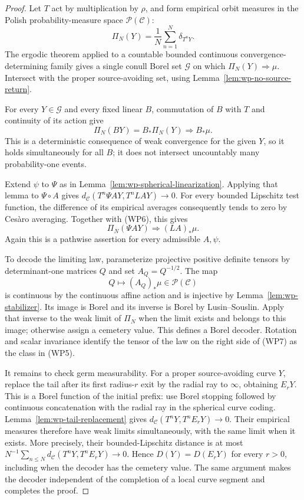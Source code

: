 \documentclass[11pt]{article}
\theoremstyle{definition}\newtheorem{definition}[theorem]{Definition}
\theoremstyle{remark}\newtheorem{remark}[theorem]{Remark}
\begin{document}
\begin{proof}
Let $T$ act by multiplication by $\rho$, and form empirical orbit
measures in the Polish probability-measure space $\mathcal P(\mathcal C)$:
\[
 \Pi_N(Y)=\frac1N\sum_{n=1}^N\delta_{T^nY}.
\]
The ergodic theorem applied to a countable bounded continuous
convergence-determining family gives a single conull Borel set
$\mathcal G$ on which $\Pi_N(Y)\Rightarrow\mu$.  Intersect with
the proper source-avoiding set, using
Lemma~\ref{lem:wp-no-source-return}.

For every $Y\in\mathcal G$ and every fixed linear $B$, commutation
of $B$ with $T$ and continuity of its action give
\[
 \Pi_N(BY)=B_*\Pi_N(Y)\Rightarrow B_*\mu.
 \tag{WP6}
\]
This is a deterministic consequence of weak convergence for the
given $Y$, so it holds simultaneously for all $B$; it does not
intersect uncountably many probability-one events.

Extend $\psi$ to $\Psi$ as in
Lemma~\ref{lem:wp-spherical-linearization}.  Applying that lemma
to $\Psi\circ A$ gives
$d_{\mathcal C}(T^n\Psi AY,T^nLAY)\to0$.
For every bounded Lipschitz test function, the difference of its
empirical averages consequently tends to zero by Ces\`aro averaging.
Together with (WP6), this gives
\[
 \Pi_N(\Psi AY)\Rightarrow(LA)_*\mu.
 \tag{WP7}
\]
Again this is a pathwise assertion for every admissible $A,\psi$.

To decode the limiting law, parameterize projective positive
definite tensors by determinant-one matrices $Q$ and set
$A_Q=Q^{-1/2}$.  The map
\[
 Q\longmapsto(A_Q)_*\mu\in\mathcal P(\mathcal C)
\]
is continuous by the continuous affine action and is injective by
Lemma~\ref{lem:wp-stabilizer}.  Its image is Borel and its inverse
is Borel by Lusin--Souslin.  Apply that inverse to the weak limit
of $\Pi_N$ when the limit exists and belongs to this image; otherwise
assign a cemetery value.  This defines a Borel decoder.
Rotation and scalar invariance identify the tensor of the law on
the right side of (WP7) as the class in (WP5).

It remains to check germ measurability.  For a proper source-avoiding
curve $Y$, replace the tail after its first radius-$r$ exit by the
radial ray to $\infty$, obtaining $E_rY$.  This is a Borel function
of the initial prefix: use Borel stopping followed by continuous
concatenation with the radial ray in the spherical curve coding.
Lemma~\ref{lem:wp-tail-replacement} gives
$d_{\mathcal C}(T^nY,T^nE_rY)\to0$.  Their empirical measures
therefore have weak limits simultaneously, with the same limit
when it exists.  More precisely, their bounded-Lipschitz distance is at most
$N^{-1}\sum_{n\le N}d_{\mathcal C}(T^nY,T^nE_rY)\to0$.
Hence $D(Y)=D(E_rY)$ for every $r>0$, including when the decoder
has the cemetery value.  The same
argument makes the decoder independent of the completion of a
local curve segment and completes the proof.
\end{proof}
\end{document}
